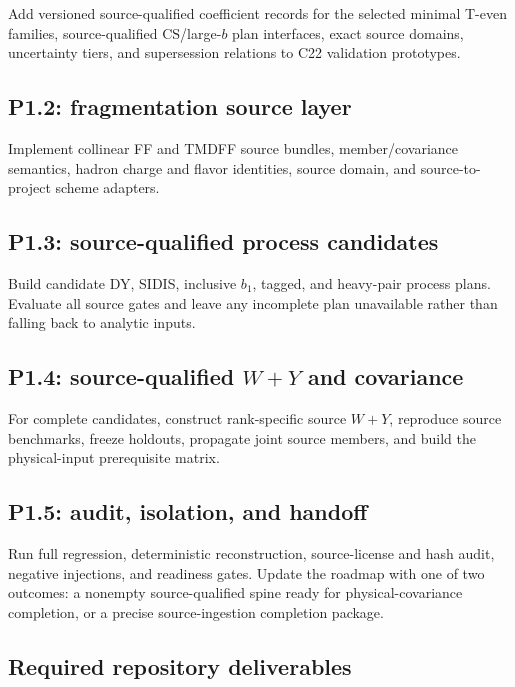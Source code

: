 \documentclass[11pt]{article}
\newcommand{\CS}{\ensuremath{\mathrm{CS}}}
\begin{document}
Add versioned source-qualified coefficient records for the selected minimal T-even families, source-qualified \CS/large-\(b\) plan interfaces, exact source domains, uncertainty tiers, and supersession relations to C22 validation prototypes.

\subsection{P1.2: fragmentation source layer}

Implement collinear FF and TMDFF source bundles, member/covariance semantics, hadron charge and flavor identities, source domain, and source-to-project scheme adapters.

\subsection{P1.3: source-qualified process candidates}

Build candidate DY, SIDIS, inclusive \(b_1\), tagged, and heavy-pair process plans.  Evaluate all source gates and leave any incomplete plan unavailable rather than falling back to analytic inputs.

\subsection{P1.4: source-qualified \texorpdfstring{\(W+Y\)}{W+Y} and covariance}

For complete candidates, construct rank-specific source \(W+Y\), reproduce source benchmarks, freeze holdouts, propagate joint source members, and build the physical-input prerequisite matrix.

\subsection{P1.5: audit, isolation, and handoff}

Run full regression, deterministic reconstruction, source-license and hash audit, negative injections, and readiness gates.  Update the roadmap with one of two outcomes: a nonempty source-qualified spine ready for physical-covariance completion, or a precise source-ingestion completion package.

\subsection{Required repository deliverables}
\end{document}
